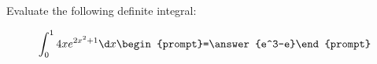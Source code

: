 \documentclass{ximera}
\author{Jim Talamo}
\begin{document}
\begin{exercise}
Evaluate the following definite integral:

\[
\int_0^1 4xe^{2x^2+1} \d x 
\begin{prompt}=\answer{e^3-e}\end{prompt}
\]
\end{exercise}
\end{document}
